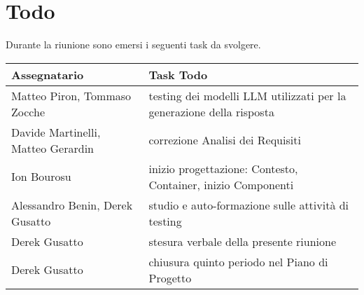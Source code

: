 \section{Todo}
Durante la riunione sono emersi i seguenti task da svolgere.

\begin{center}
  \begin{tabular}{|L{5cm}|L{8cm}|}
    \hline
    \textbf{Assegnatario} & \textbf{Task Todo} \\ \hline
      Matteo Piron, Tommaso Zocche  &  testing dei modelli LLM utilizzati per la generazione della risposta \\ \hline
      Davide Martinelli, Matteo Gerardin  &  correzione Analisi dei Requisiti \\ \hline
     Ion Bourosu  & inizio progettazione: Contesto, Container, inizio Componenti \\ \hline
     Alessandro Benin, Derek Gusatto  &  studio e auto-formazione sulle attività di testing \\ \hline
     Derek Gusatto  &  stesura verbale della presente riunione \\ \hline
    Derek Gusatto  &  chiusura quinto periodo nel Piano di Progetto \\ \hline
  \end{tabular}
\end{center}
